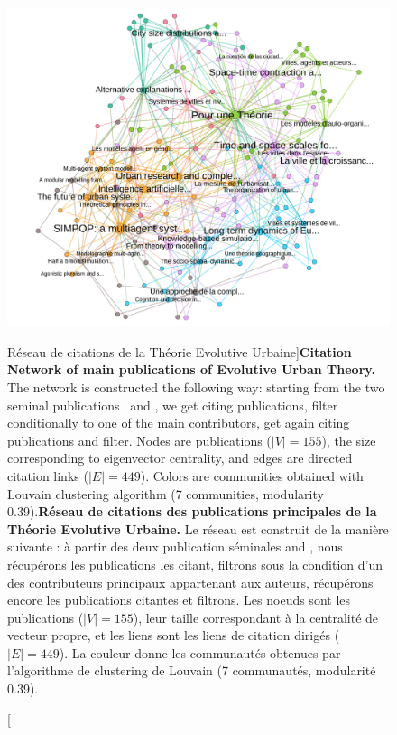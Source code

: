 \begin{figure}[h!]
\hspace{-4cm}
\includegraphics[width=1.5\textwidth]{Figures/KnowledgeFramework/core}
\caption[Citation Network of main publications of Evolutive Urban Theory][Réseau de citations de la Théorie Evolutive Urbaine]{\textbf{Citation Network of main publications of Evolutive Urban Theory.} The network is constructed the following way: starting from the two seminal publications~\cite{pumain1997pour} and \cite{sanders1997simpop}, we get citing publications, filter conditionally to one of the main contributors, get again citing publications and filter. Nodes are publications ($\left|V\right|=155$), the size corresponding to eigenvector centrality, and edges are directed citation links ($\left|E\right|=449$). Colors are communities obtained with Louvain clustering algorithm (7 communities, modularity 0.39).}{\textbf{Réseau de citations des publications principales de la Théorie Evolutive Urbaine.} Le réseau est construit de la manière suivante : à partir des deux publication séminales \cite{pumain1997pour} and \cite{sanders1997simpop}, nous récupérons les publications les citant, filtrons sous la condition d'un des contributeurs principaux appartenant aux auteurs, récupérons encore les publications citantes et filtrons. Les noeuds sont les publications ($\left|V\right|=155$), leur taille correspondant à la centralité de vecteur propre, et les liens sont les liens de citation dirigés ($\left|E\right|=449$). La couleur donne les communautés obtenues par l'algorithme de clustering de Louvain (7 communautés, modularité 0.39).}
\label{fig:knowledgeframework:citnw}
\end{figure}




